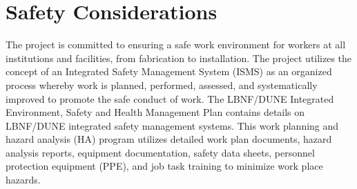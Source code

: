 \section{Safety Considerations}
\label{sec:fdsp-apa-safety}




The project is committed to ensuring a safe work environment for workers at all institutions and facilities, from  fabrication to installation. The project utilizes the concept of an Integrated Safety Management System (ISMS) as an organized process whereby work is planned, performed, assessed, and systematically improved to promote the safe conduct of work. The LBNF/DUNE Integrated Environment, Safety and Health Management Plan \cite{bib:docdb291} %
contains details on LBNF/DUNE integrated safety management systems. This work planning and hazard analysis (HA) program utilizes detailed work plan documents, hazard analysis reports, equipment documentation, safety data sheets, personnel protection equipment (PPE), and job task training to minimize work place hazards. 

